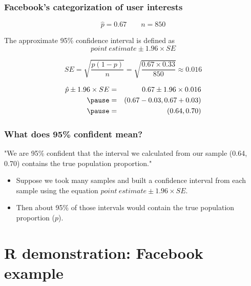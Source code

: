 \documentclass[t,compress,mathserif]{beamer}
\begin{document}
\begin{frame}
\frametitle{Facebook's categorization of user interests}

\[ \hat{p} = 0.67 \qquad n = 850 \]


The approximate 95\% confidence interval is defined as 
\[ point~estimate \pm 1.96 \times SE \]


\vspace{-0.3cm}
\[ SE = \sqrt{\frac{p(1-p)}{n}} = \sqrt{\frac{0.67 \times 0.33}{850}} \approx 0.016 \]


\vspace{-0.3cm}
\begin{eqnarray*}
\hat{p} \pm 1.96 \times SE &=& 0.67 \pm 1.96 \times 0.016 \\
\pause
&=& (0.67 - 0.03, 0.67 + 0.03) \\
\pause
&=& (0.64, 0.70)
\end{eqnarray*}

\vspace{-3em}

\end{frame}


\begin{frame}
\frametitle{What does 95\% confident mean?}

"We are 95\% confident that the interval we calculated from our sample (0.64, 0.70) contains the true population proportion."
\pause
\begin{itemize}

\item Suppose we took many samples and built a confidence interval from each sample using the equation $point~estimate \pm 1.96 \times SE$.

\item Then about 95\% of those intervals would contain the true population proportion ($p$). 

\end{itemize}

\end{frame}


\section{R demonstration: Facebook example}
\end{document}

